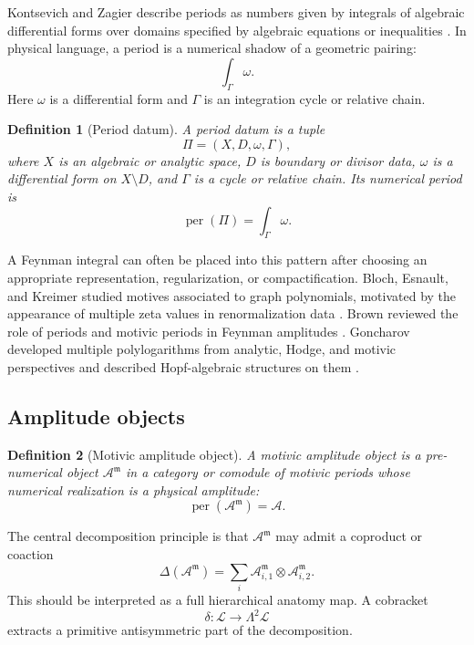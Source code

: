 \documentclass[11pt]{article}
\newtheorem{definition}{Definition}[section]
\newcommand{\per}{\operatorname{per}}
\begin{document}
Kontsevich and Zagier describe periods as numbers given by integrals of algebraic differential forms over domains specified by algebraic equations or inequalities \cite{KontsevichZagier2001}. In physical language, a period is a numerical shadow of a geometric pairing:
\[
\int_\Gamma \omega.
\]
Here $\omega$ is a differential form and $\Gamma$ is an integration cycle or relative chain.

\begin{definition}[Period datum]
A \emph{period datum} is a tuple
\[
\Pi=(X,D,\omega,\Gamma),
\]
where $X$ is an algebraic or analytic space, $D$ is boundary or divisor data, $\omega$ is a differential form on $X\setminus D$, and $\Gamma$ is a cycle or relative chain. Its numerical period is
\[
\per(\Pi)=\int_\Gamma \omega.
\]
\end{definition}

A Feynman integral can often be placed into this pattern after choosing an appropriate representation, regularization, or compactification. Bloch, Esnault, and Kreimer studied motives associated to graph polynomials, motivated by the appearance of multiple zeta values in renormalization data \cite{BlochEsnaultKreimer2006}. Brown reviewed the role of periods and motivic periods in Feynman amplitudes \cite{Brown2015Periods,Brown2015Cosmic}. Goncharov developed multiple polylogarithms from analytic, Hodge, and motivic perspectives and described Hopf-algebraic structures on them \cite{Goncharov2001}.

\subsection{Amplitude objects}

\begin{definition}[Motivic amplitude object]
A \emph{motivic amplitude object} is a pre-numerical object $\mathcal A^{\mathfrak m}$ in a category or comodule of motivic periods whose numerical realization is a physical amplitude:
\[
\per(\mathcal A^{\mathfrak m})=\mathcal A.
\]
\end{definition}

The central decomposition principle is that $\mathcal A^{\mathfrak m}$ may admit a coproduct or coaction
\[
\Delta(\mathcal A^{\mathfrak m})=\sum_i \mathcal A^{\mathfrak m}_{i,1}\otimes \mathcal A^{\mathfrak m}_{i,2}.
\]
This should be interpreted as a full hierarchical anatomy map. A cobracket
\[
\delta:\mathcal L\longrightarrow \Lambda^2\mathcal L
\]
extracts a primitive antisymmetric part of the decomposition.
\end{document}
